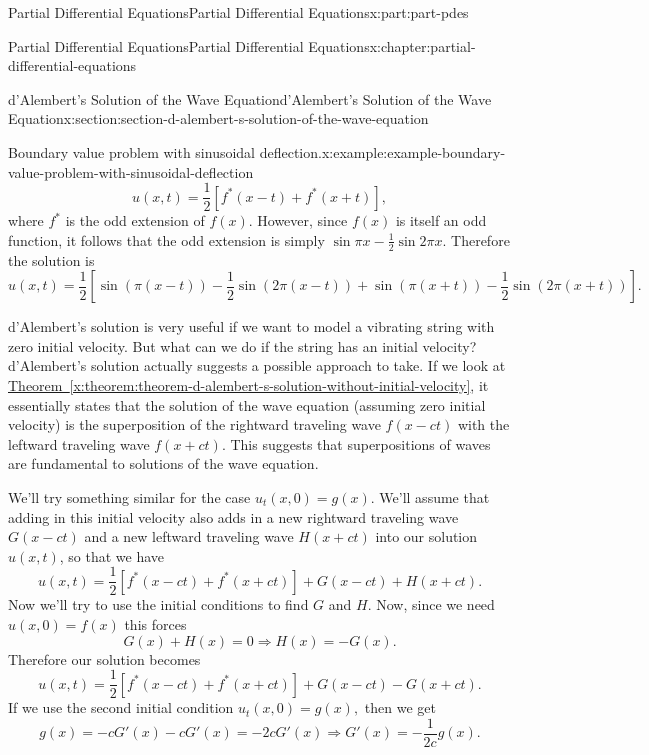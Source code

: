 \documentclass[twoside,10pt,]{book}
\newcommand{\xreffont}{\relax}
\numberwithin{equation}{part}
\begin{document}
\begin{partptx}{Partial Differential Equations}{}{Partial Differential Equations}{}{}{x:part:part-pdes}
\begin{chapterptx}{Partial Differential Equations}{}{Partial Differential Equations}{}{}{x:chapter:partial-differential-equations}
\begin{sectionptx}{d'Alembert's Solution of the Wave Equation}{}{d'Alembert's Solution of the Wave Equation}{}{}{x:section:section-d-alembert-s-solution-of-the-wave-equation}
\begin{example}{Boundary value problem with sinusoidal deflection.}{x:example:example-boundary-value-problem-with-sinusoidal-deflection}
\begin{equation*}
u(x,t) = \frac{1}{2}[f^{*}(x-t)+f^{*}(x+t)],
\end{equation*}
where \(f^{*}\) is the odd extension of \(f(x)\). However, since \(f(x)\) is itself an odd function, it follows that the odd extension is simply \(\sin\pi x-\frac{1}{2}\sin2\pi x\). Therefore the solution is%
%
\begin{equation*}
u(x,t) = \frac{1}{2}\left[\sin(\pi(x-t))-\frac{1}{2}\sin(2\pi(x-t)) + \sin(\pi(x+t)) - \frac{1}{2}\sin(2\pi(x+t))\right].
\end{equation*}
\end{example}
d'Alembert's solution is very useful if we want to model a vibrating string with zero initial velocity. But what can we do if the string has an initial velocity? d'Alembert's solution actually suggests a possible approach to take. If we look at \hyperref[x:theorem:theorem-d-alembert-s-solution-without-initial-velocity]{Theorem~{\xreffont\ref{x:theorem:theorem-d-alembert-s-solution-without-initial-velocity}}}, it essentially states that the solution of the wave equation (assuming zero initial velocity) is the superposition of the rightward traveling wave \(f(x-ct)\) with the leftward traveling wave \(f(x+ct)\). This suggests that superpositions of waves are fundamental to solutions of the wave equation.%
\par
We'll try something similar for the case \(u_{t}(x,0) = g(x)\). We'll assume that adding in this initial velocity also adds in a new rightward traveling wave \(G(x-ct)\) and a new leftward traveling wave \(H(x+ct)\) into our solution \(u(x,t)\), so that we have%
%
\begin{equation*}
u(x,t) = \frac{1}{2}[f^{*}(x-ct)+f^{*}(x+ct)] + G(x-ct) + H(x+ct).
\end{equation*}
Now we'll try to use the initial conditions to find \(G\) and \(H\). Now, since we need \(u(x,0) = f(x)\) this forces%
%
\begin{equation*}
G(x) + H(x) = 0\Rightarrow H(x) = -G(x).
\end{equation*}
Therefore our solution becomes%
\begin{equation*}
u(x,t) = \frac{1}{2}[f^{*}(x-ct)+f^{*}(x+ct)] + G(x-ct) - G(x+ct).
\end{equation*}
If we use the second initial condition \(u_{t}(x,0) = g(x),\) then we get%
\begin{equation*}
g(x) = -cG'(x) - cG'(x) = -2cG'(x) \Rightarrow G'(x) = -\frac{1}{2c}g(x).
\end{equation*}

\end{sectionptx}
\end{chapterptx}
\end{partptx}
\end{document}
